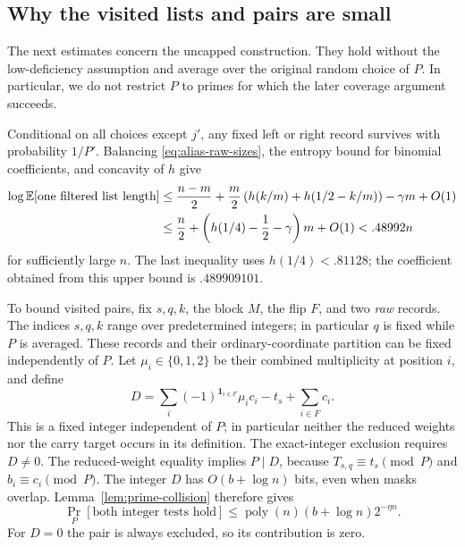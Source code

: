\subsection{Why the visited lists and pairs are small}

The next estimates concern the uncapped construction.  They hold without
the low-deficiency assumption and average over the original random
choice of $P$.  In particular, we do not restrict $P$ to primes for
which the later coverage argument succeeds.

Conditional on all choices except $j'$, any fixed left or right record
survives with probability $1/P'$.  Balancing
\eqref{eq:alias-raw-sizes}, the entropy bound for binomial coefficients,
and concavity of $h$ give
\begin{align}
 \log\mathbb E[\text{one filtered list length}]
 &\le \frac{n-m}{2}
    +\frac m2\left(h(k/m)+h(1/2-k/m)\right)
    -\gamma m+O(1)\notag\\
 &\le \frac n2+\left(h(1/4)-\frac12-\gamma\right)m+O(1)
 <.48992n
 \label{eq:alias-list-bound}
\end{align}
for sufficiently large $n$.  The last inequality uses $h(1/4)<.81128$;
the coefficient obtained from this upper bound is $.489909101$.

To bound visited pairs, fix $s,q,k$, the block $M$, the flip $F$, and
two \emph{raw} records.  The indices $s,q,k$ range over predetermined
integers; in particular $q$ is fixed while $P$ is averaged.
These records and their ordinary-coordinate
partition can be fixed independently of $P$.  Let $\mu_i\in\{0,1,2\}$
be their combined multiplicity at position $i$, and define
\begin{equation}
 D=\sum_i(-1)^{\mathbf1_{i\in F}}\mu_i c_i
       -t_s+\sum_{i\in F}c_i.
 \label{eq:alias-fixed-difference}
\end{equation}
This is a fixed integer independent of $P$; in particular neither the
reduced weights nor the carry target occurs in its definition.
The exact-integer exclusion requires $D\ne0$.  The reduced-weight equality
implies $P\mid D$, because $T_{s,q}\equiv t_s\pmod P$ and
$b_i\equiv c_i\pmod P$.
The integer $D$ has $O(b+\log n)$ bits, even when masks overlap.
Lemma~\ref{lem:prime-collision} therefore gives
\begin{equation}
 \Pr_P[\text{both integer tests hold}]
 \le\operatorname{poly}(n)(b+\log n)2^{-\eta n}.
 \label{eq:alias-large-modulus-bound}
\end{equation}
For $D=0$ the pair is always excluded, so its contribution is zero.

